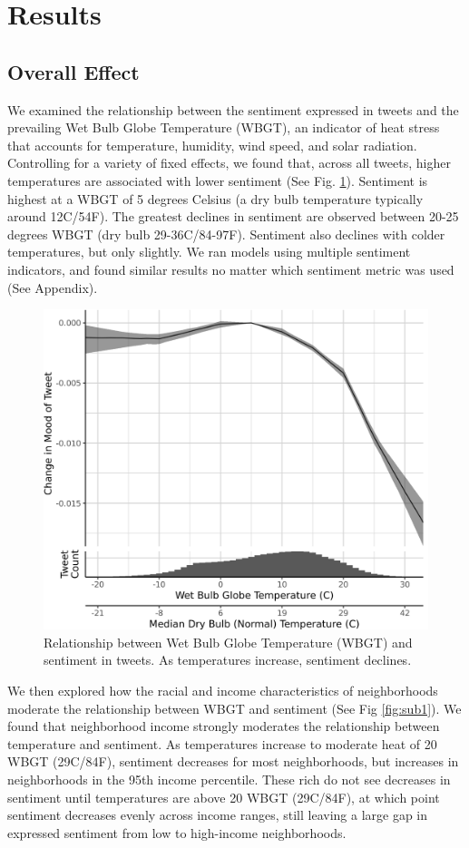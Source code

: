 \documentclass{article}
\begin{document}
\section{Results}

\subsection{Overall Effect}
We examined the relationship between the sentiment expressed in tweets and the prevailing Wet Bulb Globe Temperature (WBGT), an indicator of heat stress that accounts for temperature, humidity, wind speed, and solar radiation.  Controlling for a variety of fixed effects, we found that, across all tweets, higher temperatures are associated with lower sentiment (See Fig. \ref{fig:wbgt}).  Sentiment is highest at a WBGT of 5 degrees Celsius (a dry bulb temperature typically around 12C/54F).  The greatest declines in sentiment are observed between 20-25 degrees WBGT (dry bulb 29-36C/84-97F).  Sentiment also declines with colder temperatures, but only slightly.
We ran models using multiple sentiment indicators, and found similar results no matter which sentiment metric was used (See Appendix).

\begin{figure}[H]
  \centering
  \includegraphics[width=0.5\linewidth]{../res/wbgt.png}
  \caption{Relationship between Wet Bulb Globe Temperature (WBGT) and sentiment in tweets.  As temperatures increase, sentiment declines.}
  \label{fig:wbgt}
\end{figure}

We then explored how the racial and income characteristics of neighborhoods moderate the relationship between WBGT and sentiment (See Fig \ref{fig:sub1}).  We found that neighborhood income strongly moderates the relationship between temperature and sentiment.  As temperatures increase to moderate heat of 20 WBGT (29C/84F), sentiment decreases for most neighborhoods, but increases in neighborhoods in the 95th income percentile.  These rich do not see decreases in sentiment until temperatures are above 20 WBGT (29C/84F), at which point sentiment decreases evenly across income ranges, still leaving a large gap in expressed sentiment from low to high-income neighborhoods.
\end{document}
